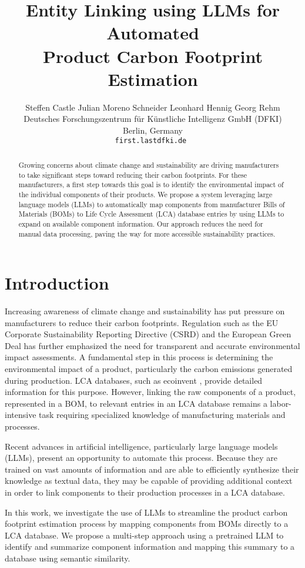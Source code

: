 \documentclass[11pt]{article}
\title{Entity Linking using LLMs for Automated \\Product Carbon Footprint Estimation}
\author{Steffen Castle \qquad 
Julian Moreno Schneider  \qquad 
Leonhard Hennig \qquad
Georg Rehm 
\\
Deutsches Forschungszentrum für Künstliche Intelligenz GmbH (DFKI) \\ Berlin, Germany \\
{\tt first.last\at dfki.de }
}
\date{}
\begin{document}
\maketitle
\begin{abstract}
Growing concerns about climate change and sustainability are driving manufacturers to take significant steps toward reducing their carbon footprints. For these manufacturers, a first step towards this goal is to identify the environmental impact of the individual components of their products. We propose a system leveraging large language models (LLMs) to automatically map components from manufacturer Bills of Materials (BOMs) to Life Cycle Assessment (LCA) database entries by using LLMs to expand on available component information. Our approach reduces the need for manual data processing, paving the way for more accessible sustainability practices.
\end{abstract}

\section{Introduction}
Increasing awareness of climate change and sustainability has put pressure on manufacturers to reduce their carbon footprints. Regulation such as the EU Corporate Sustainability Reporting Directive (CSRD) and the European Green Deal has further emphasized the need for transparent and accurate environmental impact assessments. A fundamental step in this process is determining the environmental impact of a product, particularly the carbon emissions generated during production. LCA databases, such as ecoinvent \cite{ecoinvent}, provide detailed information for this purpose. However, linking the raw components of a product, represented in a BOM, to relevant entries in an LCA database remains a labor-intensive task requiring specialized knowledge of manufacturing materials and processes.

Recent advances in artificial intelligence, particularly large language models (LLMs), present an opportunity to automate this process. Because they are trained on vast amounts of information and are able to efficiently synthesize their knowledge as textual data, they may be capable of providing additional context in order to link components to their production processes in a LCA database. 

In this work, we investigate the use of LLMs to streamline the product carbon footprint estimation process by mapping components from BOMs directly to a LCA database. We propose a multi-step approach using a pretrained LLM to identify and summarize component information and mapping this summary to a database using semantic similarity.
\end{document}
